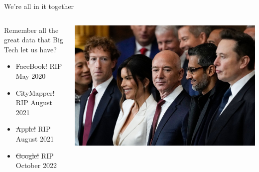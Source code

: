 \documentclass[
  ignorenonframetext,
]{beamer}
\providecommand{\tightlist}{%
  \setlength{\itemsep}{0pt}\setlength{\parskip}{0pt}}\usepackage{longtable,booktabs,array}
\begin{document}
\begin{frame}{We're all in it together}
\label{were-all-in-it-together-3}
\begin{columns}[T]
\begin{column}{0.6\textwidth}
Remember all the great data that Big Tech let us have?

\begin{itemize}
\tightlist
\item
  \st{FaceBook!} RIP May 2020
\item
  \st{CityMapper!} RIP August 2021
\item
  \st{Apple!} RIP August 2021
\item
  \st{Google!} RIP October 2022
\end{itemize}
\end{column}

\begin{column}{0.4\textwidth}
\includegraphics{images/tech_knobs.jpeg}
\end{column}
\end{columns}
\end{frame}
\end{document}
